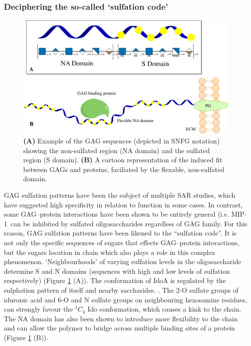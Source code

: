 \documentclass[journal=jctcce,manuscript=article]{achemso}
\begin{document}
{\subsubsection{Deciphering the so-called `sulfation code'}

\begin{figure}[bl!]
    \centering
    \includegraphics[width=13cm]{NAandSdomain.pdf}
    \caption{\textbf{(A)} Example of the GAG sequences (depicted in SNFG notation) showing the non-sulfated region (NA domain) and the sulfated region (S domain). \textbf{(B)} A cartoon representation of the induced fit between GAGs and proteins, faciliated by the flexable, non-sulfated domain.}
    \label{fig:Sdomain}
\end{figure}

\ac{GAG} sulfation patterns have been the subject of multiple \ac{SAR} studies, which have suggested high specificity in relation to function in some cases.\cite{Habuchi2004SulfationCode, Gama2006SulfationActivity} 
In contrast, some \ac{GAG}--protein interactions have been shown to be entirely general (i.e. MIP-1\textalpha~can be inhibited by sulfated oligosaccharides regardless of \ac{GAG} family. \cite{Kuschert1999GlycosaminoglycansResponses}
For this reason, GAG sulfation patterns have been likened to the “sulfation code”. \cite{Habuchi2004SulfationCode, Swarup2013SugarNeurons, Kowitsch2018MedicalReview, Gama2006SulfationActivity}
It is not only the specific sequences of sugars that effects GAG--protein interactions, but the sugars location in chain which also plays a role in this complex phenomenon. 
`Neighbourhoods' of varying sulfation levels in the oligosaccharide determine S and N domains (sequences with high and low levels of sulfation respectively) (Figure \ref{fig:Sdomain} (A)). 
The conformation of IdoA is regulated by the sulphation pattern of itself and nearby saccharides. \cite{Hsieh2016UncoveringSulphate}.
The 2-O sulfate groups of iduronic acid and 6-O and N sulfate groups on neighbouring hexosamine residues, can strongly favour the $^{1}C_{4}$ Ido conformation, which causes a kink to the chain. \cite{Raman2005StructuralInteractions}
The NA domain has also been shown to introduce more flexibility to the chain and can allow the polymer to bridge across multiple binding sites of a protein (Figure \ref{fig:Sdomain} (B)). \cite{Capila2002Heparin-proteinInteractions., Nahain2018HeparinActivity, Li2004StructureHeparin, Dementiev2004TheSpecificity}

}
\end{document}
